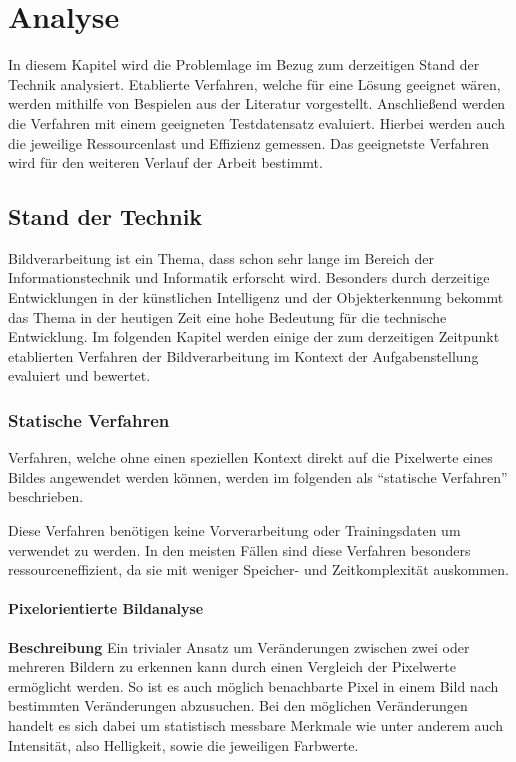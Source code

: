 \chapter{Analyse}
In diesem Kapitel wird die Problemlage im Bezug zum derzeitigen Stand der Technik analysiert.
Etablierte Verfahren, welche für eine Lösung geeignet wären, werden mithilfe von Bespielen aus der Literatur vorgestellt.
Anschließend werden die Verfahren mit einem geeigneten Testdatensatz evaluiert.
Hierbei werden auch die jeweilige Ressourcenlast und Effizienz gemessen.
Das geeignetste Verfahren wird für den weiteren Verlauf der Arbeit bestimmt.

\section{Stand der Technik}
Bildverarbeitung ist ein Thema, dass schon sehr lange im Bereich der Informationstechnik und Informatik erforscht wird.
Besonders durch derzeitige Entwicklungen in der künstlichen Intelligenz und der Objekterkennung bekommt das Thema in der heutigen Zeit eine hohe Bedeutung für die technische Entwicklung. Im folgenden Kapitel werden einige der zum derzeitigen Zeitpunkt etablierten Verfahren der Bildverarbeitung im Kontext der Aufgabenstellung evaluiert und bewertet.

\subsection{Statische Verfahren}
Verfahren, welche ohne einen speziellen Kontext direkt auf die Pixelwerte eines Bildes angewendet werden können, werden im folgenden als "`statische Verfahren"' beschrieben. 

Diese Verfahren benötigen keine Vorverarbeitung oder Trainingsdaten um verwendet zu werden.
In den meisten Fällen sind diese Verfahren besonders ressourceneffizient, da sie mit weniger Speicher- und Zeitkomplexität auskommen.
\subsubsection{Pixelorientierte Bildanalyse}
\textbf{Beschreibung}\newline
Ein trivialer Ansatz um Veränderungen zwischen zwei oder mehreren Bildern zu erkennen kann durch einen Vergleich der Pixelwerte ermöglicht werden.
So ist es auch möglich benachbarte Pixel in einem Bild nach bestimmten Veränderungen abzusuchen.
Bei den möglichen Veränderungen handelt es sich dabei um statistisch messbare Merkmale wie unter anderem auch Intensität, also Helligkeit, sowie die jeweiligen Farbwerte.

